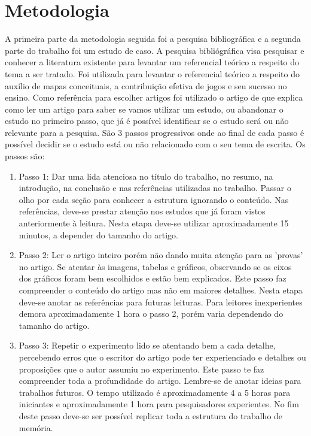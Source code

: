 \chapter[Metodologia]{Metodologia}
A primeira parte da metodologia seguida foi a pesquisa bibliográfica e a segunda parte do trabalho foi um estudo de caso. A pesquisa bibliógráfica visa pesquisar e conhecer a literatura existente para levantar um referencial teórico a respeito do tema a ser tratado. Foi utilizada para levantar o referencial teórico a respeito do auxílio de mapas conceituais, a contribuição efetiva de jogos e seu sucesso no ensino.
Como referência para escolher artigos foi utilizado o artigo de \cite{howtoread} que explica como ler um artigo para saber se vamos utilizar um estudo, ou abandonar o estudo no primeiro passo, que já é possível identificar se o estudo será ou não relevante para a pesquisa. São 3 passos progressivos onde ao final de cada passo é possível decidir se o estudo está ou não relacionado com o seu tema de escrita. Os passos são:

\begin{enumerate}
\item{Passo 1:} Dar uma lida atenciosa no título do trabalho, no resumo, na introdução, na conclusão e nas referências utilizadas no trabalho. Passar o olho por cada seção para conhecer a estrutura ignorando o conteúdo. Nas referências, deve-se prestar atenção nos estudos que já foram vistos anteriormente à leitura. Nesta etapa deve-se utilizar aproximadamente 15 minutos, a depender do tamanho do artigo.

\item{Passo 2:} Ler o artigo inteiro porém não dando muita atenção para as 'provas' no artigo. Se atentar às imagens, tabelas e gráficos, observando se os eixos dos gráficos foram bem escolhidos e estão bem explicados. Este passo faz compreender o conteúdo do artigo mas não em maiores detalhes. Nesta etapa deve-se anotar as referências para futuras leituras. Para leitores inexperientes demora aproximadamente 1 hora o passo 2, porém varia dependendo do tamanho do artigo.

\item{Passo 3:} Repetir o experimento lido se atentando bem a cada detalhe, percebendo erros que o escritor do artigo pode ter experienciado e detalhes ou proposições que o autor assumiu no experimento. Este passo te faz compreender toda a profundidade do artigo. Lembre-se de anotar ideias para trabalhos futuros. O tempo utilizado é aproximadamente 4 a 5 horas para iniciantes e aproximadamente 1 hora para pesquisadores experientes. No fim deste passo deve-se ser possível replicar toda a estrutura do trabalho de memória.
\end{enumerate}

